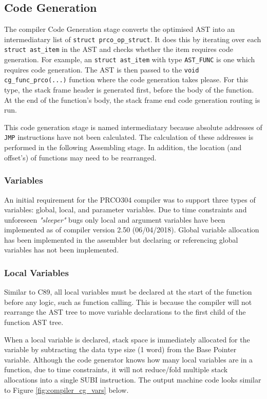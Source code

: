 \documentclass[11pt,a4paper]{report}
\newcommand{\scname}{PRCO304}
\begin{document}
\subsection{Code Generation}
The compiler Code Generation stage converts the optimised AST into an intermediatary list of \texttt{struct prco_op_struct}. It does this by iterating over each \texttt{struct ast_item} in the AST and checks whether the item requires code generation. For example, an \texttt{struct ast_item} with type \texttt{AST_FUNC} is one which requires code generation. The AST is then passed to the \texttt{void cg_func_prco(...)} function where the code generation takes please. For this type, the stack frame header is generated first, before the body of the function. At the end of the function's body, the stack frame end code generation routing is run.

This code generation stage is named intermediatary because absolute addresses of \verb|JMP| instructions have not been calculated. The calculation of these addresses is performed in the following Assembling stage. In addition, the location (and offset's) of functions may need to be rearranged.

\subsubsection{Variables}
\label{sect:compiler_cg_vars}
An initial requirement for the \scname{} compiler was to support three types of variables: global, local, and parameter variables. Due to time constraints and unforeseen \textit{"sleeper"} bugs only local and argument variables have been implemented as of compiler version 
2.50 (06/04/2018). Global variable allocation has been implemented in the assembler but declaring or referencing global variables has not been implemented.

\subsubsection*{Local Variables}
Similar to C89, all local variables must be declared at the start of the function before any logic, such as function calling. This is because the compiler will not rearrange the AST tree to move variable declarations to the first child of the function AST tree.

When a local variable is declared, stack space is immediately allocated for the variable by subtracting the data type size (1 word) from the Base Pointer variable. Although the code generator knows how many local variables are in a function, due to time constraints, it will not reduce/fold multiple stack allocations into a single SUBI instruction. The output machine code looks similar to Figure \ref{fig:compiler_cg_vars} below.
\end{document}
